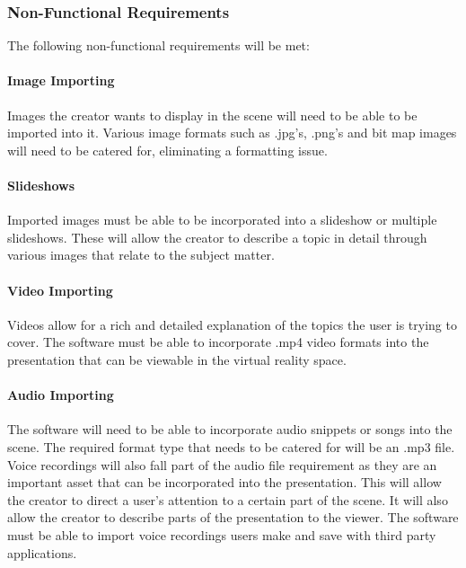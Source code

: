 	\subsubsection{Non-Functional Requirements}

	The following non-functional requirements will be met:

		\paragraph{Image Importing}

		Images the creator wants to display in the scene will need to be able to be imported into it.
		Various image formats such as .jpg's, .png's and bit map images will need to be catered for, eliminating a formatting issue.

		\paragraph{Slideshows}

		Imported images must be able to be incorporated into a slideshow or multiple slideshows.
		These will allow the creator to describe a topic in detail through various images that relate to the subject matter.

		\paragraph{Video Importing}

		Videos allow for a rich and detailed explanation of the topics the user is trying to cover.
		The software must be able to incorporate .mp4 video formats into the presentation that can be viewable in the virtual reality space.

		\paragraph{Audio Importing}

		The software will need to be able to incorporate audio snippets or songs into the scene.
		The required format type that needs to be catered for will be an .mp3 file.
		Voice recordings will also fall part of the audio file requirement as they are an important asset that can be incorporated into the presentation.
		This will allow the creator to direct a user’s attention to a certain part of the scene.
		It will also allow the creator to describe parts of the presentation to the viewer.
		The software must be able to import voice recordings users make and save with third party applications.

